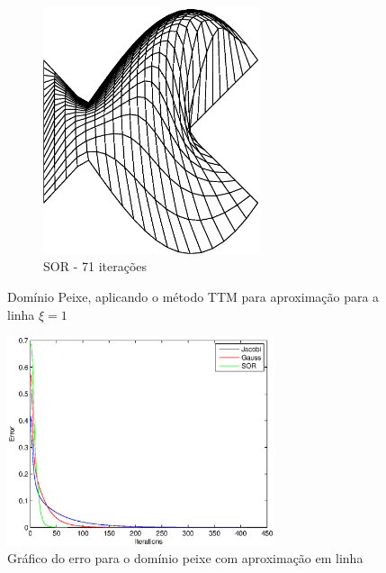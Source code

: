 \documentclass{article}
\begin{document}
\begin{figure}
\begin{subfigure}[b]{0.45\textwidth}
				\centering
				\includegraphics[width=0.7\textwidth]{figures/fish-ttm-sor.eps}
				\caption{SOR - 71 iterações}
			\end{subfigure}
			\caption{Domínio Peixe, aplicando o método TTM para aproximação para a linha $\xi = 1$}
			\label{fig:fish:ttm:}
			\centering
			\includegraphics[width=0.7\textwidth]{figures/fish-ttm-error.eps}
			\caption{Gráfico do erro para o domínio peixe com aproximação em linha}
			\label{fig:fish:ttm:erro}
		\end{figure}
\end{document}
